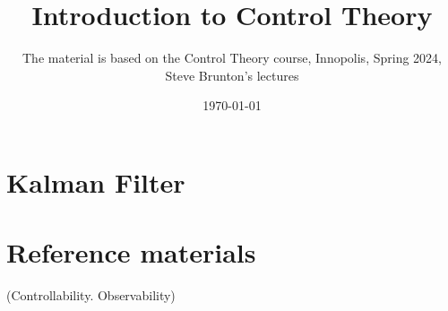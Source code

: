 \documentclass{article}
\title{Introduction to Control Theory}
\author{The material is based on the Control Theory course, Innopolis, Spring 2024,\\
Steve Brunton's lectures}
\date{\today}
\begin{document}
\maketitle

\tableofcontents
\newpage


























\section{Kalman Filter}



\section{Reference materials}


(Controllability. Observability)




\end{document}
